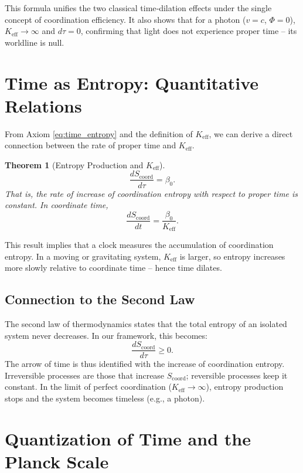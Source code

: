 \documentclass[12pt,a4paper]{article}
\newtheorem{theorem}{Theorem}[section]
\newcommand{\Keff}{K_{\mathrm{eff}}}
\newcommand{\Scoord}{S_{\mathrm{coord}}}
\begin{document}
	This formula unifies the two classical time‑dilation effects under the single concept of coordination efficiency. It also shows that for a photon (\(v=c\), \(\Phi=0\)), \(\Keff \to \infty\) and \(d\tau = 0\), confirming that light does not experience proper time – its worldline is null.
	
	\section{Time as Entropy: Quantitative Relations}
	\label{sec:entropy}
	
	From Axiom \ref{eq:time_entropy} and the definition of \(\Keff\), we can derive a direct connection between the rate of proper time and \(\Keff\).
	
	\begin{theorem}[Entropy Production and \(\Keff\)]
		\[
		\frac{d\Scoord}{d\tau} = \beta_0.
		\]
		That is, the rate of increase of coordination entropy with respect to proper time is constant. In coordinate time,
		\[
		\frac{d\Scoord}{dt} = \frac{\beta_0}{\Keff}.
		\]
	\end{theorem}
	
	This result implies that a clock measures the accumulation of coordination entropy. In a moving or gravitating system, \(\Keff\) is larger, so entropy increases more slowly relative to coordinate time – hence time dilates.
	
	\subsection{Connection to the Second Law}
	
	The second law of thermodynamics states that the total entropy of an isolated system never decreases. In our framework, this becomes:
	\begin{equation}
		\frac{d\Scoord}{d\tau} \ge 0.
	\end{equation}
	The arrow of time is thus identified with the increase of coordination entropy. Irreversible processes are those that increase \(\Scoord\); reversible processes keep it constant. In the limit of perfect coordination (\(\Keff \to \infty\)), entropy production stops and the system becomes timeless (e.g., a photon).
	
	\section{Quantization of Time and the Planck Scale}
	\label{sec:quantization}
	
\end{document}
